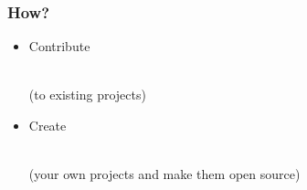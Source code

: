 \documentclass{beamer}
\begin{document}

\begin{frame}
  \frametitle{How?}
  \begin{itemize}
    \setlength{\itemsep}{2em}
  \item \begin{LARGE} \textcolor<2>{beamer@myblue}{Contribute} \end{LARGE} \\ \textcolor<2>{beamer@myblue}{(to existing projects)} \\
  \item \begin{LARGE} \textcolor<2>{beamer@mygrey}{Create} \end{LARGE} \\ \textcolor<2>{beamer@mygrey}{(your own projects and make them open source)}
  \end{itemize}
\end{frame}
\end{document}
